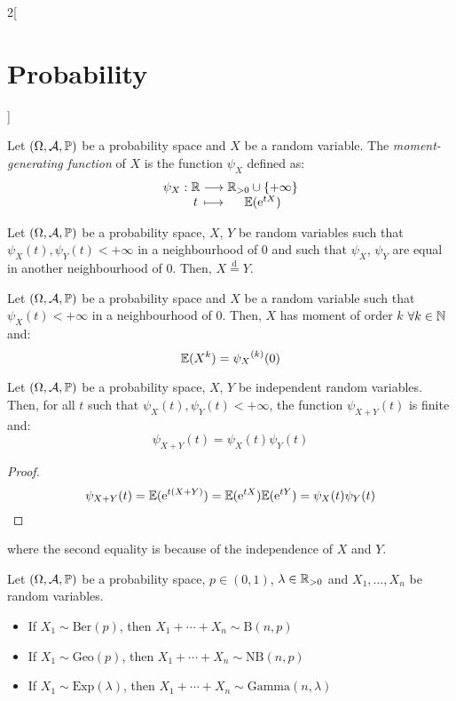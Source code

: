 \documentclass[../../../main_math.tex]{subfiles}
\begin{document}
\begin{multicols}{2}[\section{Probability}]
\begin{corollary}
  \end{corollary}
  \begin{definition}\label{P:moment-generating}
    Let $(\Omega,\mathcal{A},\mathbb{P})$ be a probability space and $X$ be a random variable. The \emph{moment-generating function} of $X$ is the function $\psi_X$ defined as:
    $$\function{\psi_X}{\RR}{\RR_{>0}\cup\{+\infty\}}{t}{\Exp(\exp{tX})}$$
  \end{definition}
  \begin{theorem}
    Let $(\Omega,\mathcal{A},\mathbb{P})$ be a probability space, $X$, $Y$ be random variables such that $\psi_X(t),\psi_Y(t)<+\infty$ in a neighbourhood of 0 and such that $\psi_X$, $\psi_Y$ are equal in another neighbourhood of 0. Then, $X\overset{\text{d}}{=}Y$.
  \end{theorem}
  \begin{theorem}
    Let $(\Omega,\mathcal{A},\mathbb{P})$ be a probability space and $X$ be a random variable such that $\psi_X(t)<+\infty$ in a neighbourhood of 0. Then, $X$ has moment of order $k$ $\forall k\in\mathbb{N}$ and: $$\mathbb{E}(X^k)={\psi_X}^{(k)}(0)$$
  \end{theorem}
  \begin{theorem}
    Let $(\Omega,\mathcal{A},\mathbb{P})$ be a probability space, $X$, $Y$ be independent random variables. Then, for all $t$ such that $\psi_X(t),\psi_Y(t)<+\infty$, the function $\psi_{X+Y}(t)$ is finite and: $$\psi_{X+Y}(t)=\psi_X(t)\psi_Y(t)$$
  \end{theorem}
  \begin{proof}
    $$\psi_{X+Y}(t)=\mathbb{E}(\mathrm{e}^{t(X+Y)})=\mathbb{E}(\mathrm{e}^{tX})\mathbb{E}(\mathrm{e}^{tY})=\psi_X(t)\psi_Y(t)$$
  \end{proof}
  where the second equality is because of the independence of $X$ and $Y$.
  \begin{proposition}
    Let $(\Omega,\mathcal{A},\mathbb{P})$ be a probability space, $p\in(0,1)$, $\lambda\in\mathbb{R}_{>0}$ and $X_1,\ldots,X_n$ be \iid random variables.
    \begin{itemize}
      \item If $X_1\sim\text{Ber}(p)$, then $X_1+\cdots+X_n\sim\text{B}(n,p)$
      \item If $X_1\sim\text{Geo}(p)$, then $X_1+\cdots+X_n\sim\text{NB}(n,p)$
      \item If $X_1\sim\text{Exp}(\lambda)$, then $X_1+\cdots+X_n\sim\text{Gamma}(n,\lambda)$
    \end{itemize}
  \end{proposition}
  \begin{proposition}

\end{proposition}
\end{multicols}
\end{document}
